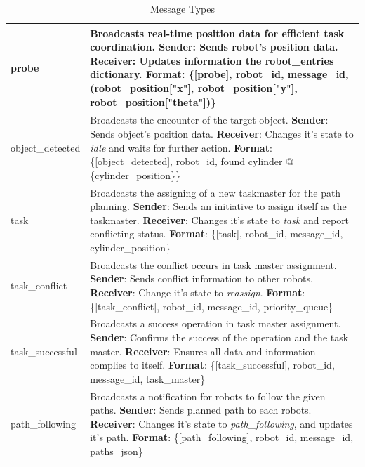 \begin{table}[ht]
\centering
\begin{tabular}{|p{3cm}|p{12cm}|}
\hline
 probe & Broadcasts real-time position data for efficient task coordination. 
 \newline \textbf{Sender}: Sends robot's position data. 
 \newline \textbf{Receiver}: Updates information the robot\_entries dictionary. 
 \newline \textbf{Format}: \{[probe], robot\_id, message\_id, (robot\_position["x"], robot\_position["y"], robot\_position["theta"])\} \\ 
 \hline
 object\_detected & Broadcasts the encounter of the target object. 
 \newline \textbf{Sender}: Sends object's position data. \newline \textbf{Receiver}: Changes it's state to \textit{idle} and waits for further action. \newline \textbf{Format}: \{[object\_detected], robot\_id, found cylinder @ \{cylinder\_position\}\} \\ 
 \hline
 task & Broadcasts the assigning of a new taskmaster for the path planning. 
 \newline \textbf{Sender}: Sends an initiative to assign itself as the taskmaster. 
 \newline \textbf{Receiver}: Changes it's state to \textit{task} and report conflicting status. 
 \newline \textbf{Format}: \{[task], robot\_id, message\_id, cylinder\_position\}\\ 
 \hline
 task\_conflict & Broadcasts the conflict occurs in task master assignment. 
 \newline \textbf{Sender}: Sends conflict information to other robots. \newline \textbf{Receiver}: Change it's state to \textit{reassign}. 
 \newline \textbf{Format}: \{[task\_conflict], robot\_id, message\_id, priority\_queue\}\\ 
 \hline
 task\_successful & Broadcasts a success operation in task master assignment.  
 \newline \textbf{Sender}: Confirms the success of the operation and the task master. 
 \newline \textbf{Receiver}: Ensures all data and information complies to itself.
 \newline \textbf{Format}: \{[task\_successful], robot\_id, message\_id, task\_master\}\\ 
 \hline
 path\_following & Broadcasts a notification for robots to follow the given paths.  
 \newline \textbf{Sender}: Sends planned path to each robots. 
 \newline \textbf{Receiver}: Changes it's state to \textit{path\_following}, and updates it's path.
 \newline \textbf{Format}: \{[path\_following], robot\_id, message\_id, paths\_json\}\\ 
 \hline
\end{tabular}
\caption{Message Types}
\end{table}

